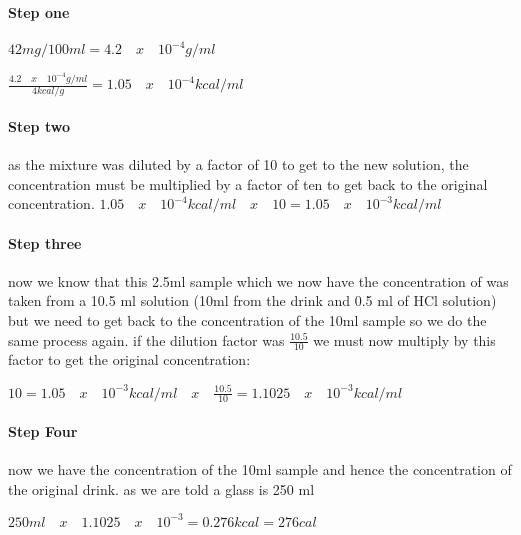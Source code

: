 \documentclass[]{article}
\date{}
\let\oldparagraph\paragraph
\renewcommand{\paragraph}[1]{\oldparagraph{#1}\mbox{}}
\begin{document}
\hypertarget{step-one}{%
\paragraph{Step one}\label{step-one}}

\(42mg/100ml=4.2 \quad x \quad 10^{-4}g/ml\)

\(\frac{ 4.2 \quad x \quad 10^{-4}g/ml}{4kcal/g}=1.05 \quad x \quad 10^{-4}kcal/ml\)

\hypertarget{step-two}{%
\paragraph{Step two}\label{step-two}}

as the mixture was diluted by a factor of 10 to get to the new solution,
the concentration must be multiplied by a factor of ten to get back to
the original concentration.
\(1.05 \quad x \quad 10^{-4}kcal/ml \quad x \quad 10 =1.05 \quad x \quad 10^{-3}kcal/ml\)

\hypertarget{step-three}{%
\paragraph{Step three}\label{step-three}}

now we know that this 2.5ml sample which we now have the concentration
of was taken from a 10.5 ml solution (10ml from the drink and 0.5 ml of
HCl solution) but we need to get back to the concentration of the 10ml
sample so we do the same process again. if the dilution factor was
\(\frac{10.5}{10}\) we must now multiply by this factor to get the
original concentration:

\(10 =1.05 \quad x \quad 10^{-3}kcal/ml \quad x \quad \frac{10.5}{10}=1.1025 \quad x \quad 10^{-3}kcal/ml \quad\)

\hypertarget{step-four}{%
\paragraph{Step Four}\label{step-four}}

now we have the concentration of the 10ml sample and hence the
concentration of the original drink. as we are told a glass is 250 ml

\(250ml \quad x \quad 1.1025 \quad x \quad 10^{-3}=0.276kcal= 276cal\)
\end{document}
